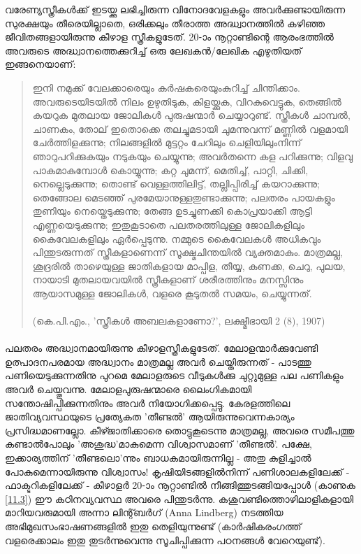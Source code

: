 വരേണ്യസ്ത്രീകൾക്ക് ഇടയ്ക്കു ലഭിച്ചിരുന്ന വിനോദവേളകളും അവർക്കുണ്ടായിരുന്ന സുരക്ഷയും തീരെയില്ലാതെ, ഒരിക്കലും തീരാത്ത അദ്ധ്വാനത്തിൽ കഴിഞ്ഞ ജീവിതങ്ങളായിരുന്നു കീഴാള സ്ത്രീകളുടേത്. 20-ാം നൂറ്റാണ്ടിന്റെ ആരംഭത്തിൽ അവരുടെ അദ്ധ്വാനത്തെക്കുറിച്ച് ഒരു ലേഖകൻ/ലേഖിക എഴുതിയത് ഇങ്ങനെയാണ്:
\begin{quotation}
\noindent ഇനി നമുക്ക് വേലക്കാരെയും കർഷകരെയുംകുറിച്ച് ചിന്തിക്കാം. അവരുടെയിടയിൽ നിലം ഉഴുതിടുക, കിളയ്ക്കുക, വിറകുവെട്ടുക, തെങ്ങിൽ കയറുക മുതലായ ജോലികൾ പുരുഷന്മാർ ചെയ്യാറുണ്ട്. സ്ത്രീകൾ ചാമ്പൽ, ചാണകം, തോല് ഇതൊക്കെ തലച്ചുമടായി ചുമന്നുവന്ന് മണ്ണിൽ വളമായി ചേർത്തിളക്കുന്നു; നിലങ്ങളിൽ മുട്ടറ്റം ചേറിലും ചെളിയിലുംനിന്ന് ഞാറുപറിക്കുകയും നടുകയും ചെയ്യുന്നു; അവർതന്നെ കള പറിക്കുന്നു; വിളവു പാകമാകുമ്പോൾ കൊയ്യുന്നു; കറ്റ ചുമന്ന്, മെതിച്ച്, പാറ്റി, ചിക്കി, നെല്ലെടുക്കുന്നു; തൊണ്ട് വെള്ളത്തിലിട്ട്, തല്ലിപ്പിരിച്ച് കയറാക്കുന്നു; തെങ്ങോല മെടഞ്ഞ് പുരമേയാനുള്ളതുണ്ടാക്കുന്നു; പലതരം പായകളും തുണിയും നെയ്തെടുക്കുന്നു; തേങ്ങ ഉടച്ചുണക്കി കൊപ്രയാക്കി ആട്ടി എണ്ണയെടുക്കുന്നു; ഇതുകൂടാതെ പലതരത്തിലുള്ള ജോലികളിലും കൈവേലകളിലും ഏർപ്പെടുന്നു. നമ്മുടെ കൈവേലകൾ അധികവും പിന്തുടരുന്നത് സ്ത്രീകളാണെന്ന് സൂക്ഷ്മചിന്തയിൽ വ്യക്തമാകും. മാത്രമല്ല, ശൂദ്രരിൽ താഴെയുള്ള ജാതികളായ മാപ്പിള, തീയ്യ, കണക്ക, ചെറു, പുലയ, നായാടി മുതലായവയിൽ സ്ത്രീകളാണ് ശരീരത്തിനും മനസ്സിനും ആയാസമുള്ള ജോലികൾ, വളരെ കൂടുതൽ സമയം, ചെയ്യുന്നത്.\\
\\(കെ.പി.എം., 'സ്ത്രീകൾ അബലകളാണോ?', ലക്ഷ്മീഭായി 2 (8), 1907)
\end{quotation}

\paragraph{} പലതരം അദ്ധ്വാനമായിരുന്നു കീഴാളസ്ത്രീകളുടേത്. മേലാളന്മാർക്കുവേണ്ടി ഉത്പാദനപരമായ അദ്ധ്വാനം മാത്രമല്ല അവർ ചെയ്തിരുന്നത് - പാടത്തു പണിയെടുക്കുന്നതിനു പുറമെ മേലാളരുടെ വീടുകൾക്കു ചുറ്റുമുള്ള പല പണികളും അവർ ചെയ്തുവന്നു. മേലാളപുരുഷന്മാരെ ലൈംഗികമായി സന്തോഷിപ്പിക്കുന്നതിനും അവർ നിയോഗിക്കപ്പെട്ടു. കേരളത്തിലെ ജാതിവ്യവസ്ഥയുടെ പ്രത്യേകത 'തീണ്ടൽ' ആയിരുന്നുവെന്നകാര്യം പ്രസിദ്ധമാണല്ലോ. കീഴ്ജാതിക്കാരെ തൊട്ടുകൂടെന്നു മാത്രമല്ല, അവരെ സമീപത്തു കണ്ടാൽപോലും 'അശുദ്ധ'മാകുമെന്ന വിശ്വാസമാണ് 'തീണ്ടൽ'. പക്ഷേ, ഇക്കാര്യത്തിന് 'തീണ്ടലൊ'ന്നും ബാധകമായിരുന്നില്ല - അതു കുളിച്ചാൽ പോകുമെന്നായിരുന്നു വിശ്വാസം! കൃഷിയിടങ്ങളിൽനിന്ന് പണിശാലകളിലേക്ക് - ഫാക്ടറികളിലേക്ക് - കീഴാളർ 20-ാം നൂറ്റാണ്ടിൽ നീങ്ങിത്തുടങ്ങിയപ്പോൾ (കാണുക \ref{11.3}) ഈ കഠിനവ്യവസ്ഥ അവരെ പിന്തുടർന്നു. കശുവണ്ടിത്തൊഴിലാളികളായി മാറിയവരുമായി അന്നാ ലിന്റ്ബർഗ് (Anna Lindberg) നടത്തിയ അഭിമുഖസംഭാഷണങ്ങളിൽ ഇതു തെളിയുന്നുണ്ട് (കാർഷികരംഗത്ത് വളരെക്കാലം ഇതു തുടർന്നുവെന്നു സൂചിപ്പിക്കുന്ന പഠനങ്ങൾ വേറെയുണ്ട്).
